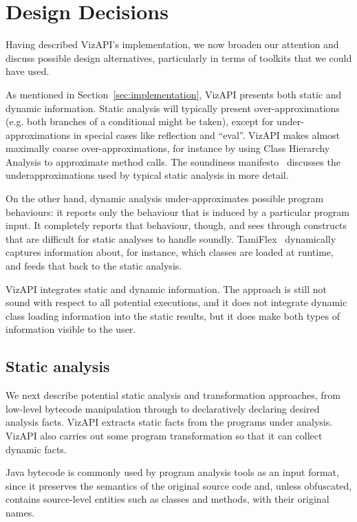 \section{Design Decisions}
\label{sec:design-decisions}

Having described VizAPI's implementation, we now broaden our attention
and discuss possible design alternatives, particularly in terms of toolkits
that we could have used.

As mentioned in Section~\ref{sec:implementation}, VizAPI presents both
static and dynamic information. Static analysis will typically present
over-approximations (e.g. both branches of a conditional might be
taken), except for under-approximations in special cases like
reflection and ``eval''. VizAPI makes almost maximally coarse
over-approximations, for instance by using Class Hierarchy Analysis to
approximate method calls. The soundiness
manifesto~\cite{livshits15:_in_defen_sound} discusses the
underapproximations used by typical static analysis in more detail.

On the other hand, dynamic analysis under-approximates possible
program behaviours: it reports only the behaviour that is induced by
a particular program input. It completely reports that behaviour, though,
and sees through constructs that are difficult for static analyses to
handle soundly. TamiFlex~\cite{bodden11:_tamin_reflec} dynamically captures
information about, for instance, which classes are loaded at runtime,
and feeds that back to the static analysis.

VizAPI integrates static and dynamic information. The approach is still not
sound with respect to all potential executions, and it does not integrate
dynamic class loading information into the static results, but it does
make both types of information visible to the user.

\subsection{Static analysis}
We next describe potential static analysis and transformation
approaches, from low-level bytecode manipulation through to
declaratively declaring desired analysis facts. VizAPI extracts static
facts from the programs under analysis. VizAPI also carries out some
program transformation so that it can collect dynamic facts.

Java bytecode is commonly used by program analysis tools as an input format,
since it preserves the semantics of the original source code and, unless
obfuscated, contains source-level entities such as classes and methods,
with their original names.

